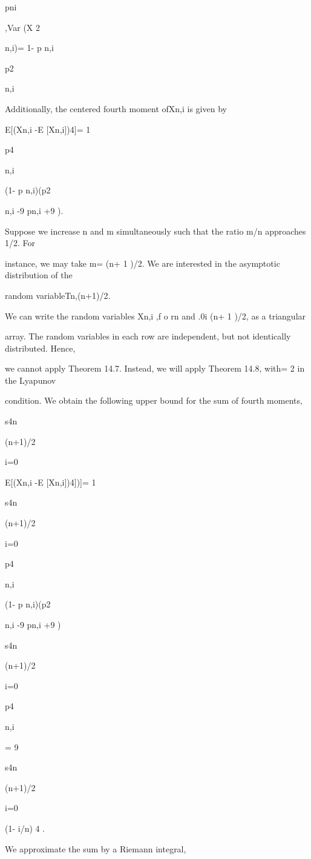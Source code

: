 pni

,Var (X 2

n,i)= 1- p n,i

p2

n,i

Additionally, the centered fourth moment ofXn,i is given by

E[(Xn,i -E [Xn,i])4]= 1

p4

n,i

(1- p n,i)(p2

n,i -9 pn,i +9 ).

Suppose we increase n and m simultaneously such that the ratio m/n approaches 1/2. For

instance, we may take m= (n+ 1 )/2. We are interested in the asymptotic distribution of the

random variableTn,(n+1)/2.

We can write the random variables Xn,i ,f o rn and .0\leq i \leq (n+ 1 )/2, as a triangular

array. The random variables in each row are independent, but not identically distributed. Hence,

we cannot apply Theorem 14.7. Instead, we will apply Theorem 14.8, with\delta= 2 in the Lyapunov

condition. We obtain the following upper bound for the sum of fourth moments,

s4n

(n+1)/2\sum

i=0

E[(Xn,i -E [Xn,i])4])]= 1

s4n

(n+1)/2\sum

i=0

p4

n,i

(1- p n,i)(p2

n,i -9 pn,i +9 )


s4n

(n+1)/2\sum

i=0

p4

n,i

= 9

s4n

(n+1)/2\sum

i=0

(1- i/n) 4 .

We approximate the sum by a Riemann integral,


